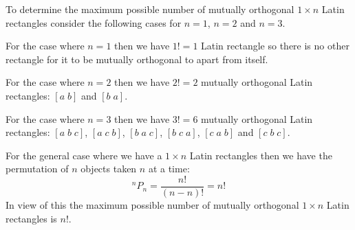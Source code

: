 To determine the maximum possible number of mutually orthogonal $1\times n$ Latin rectangles consider the following cases for $n=1$, $n=2$ and $n=3$.

For the case where $n=1$ then we have $1!=1$ Latin rectangle so there is no other rectangle for it to be mutually orthogonal to apart from itself.

For the case where $n=2$ then we have $2!=2$  mutually orthogonal Latin rectangles: $[a\; b]$ and $[b\; a]$.

For the case where $n=3$ then we have $3!=6$ mutually orthogonal Latin rectangles:
$[a\;b\;c]$, $[a\;c\;b]$, $[b\;a\;c]$, $[b\;c\;a]$, $[c\;a\;b]$ and $[c\;b\;c]$.

For the general case where we have a $1\times n$ Latin rectangles then we have the permutation of $n$ objects taken $n$ at a time:
\[
	^nP_n = \frac{n!}{(n-n)!} = n!
\]
In view of this the maximum possible number of mutually orthogonal $1\times n$ Latin rectangles is $n!$.